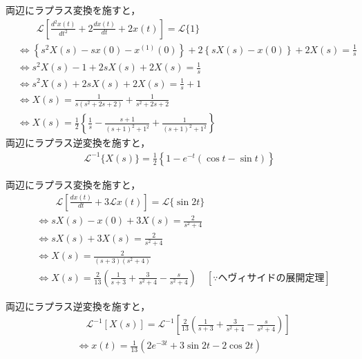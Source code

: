 \documentclass[a4paper,12pt]{article}
\begin{document}
\begin{tcolorbox}[title={3. \( \ddot{x}(t) + 2\dot{x}(t) + 2x(t) = 1\)を解け。ただし、\(x(0)=0,\dot{x}(0)=1\)とする。
    }]
    \quad 両辺にラプラス変換を施すと，
    \begin{align*}
        &\qquad \mathcal{L}\left[ \frac{d^2 x(t)}{dt^2} + 2 \frac{dx(t)}{dt} + 2x(t) \right] = \mathcal{L}\{1\} \\
        &\Leftrightarrow \left\{s^2 X(s) - sx(0) - x^{(1)}(0) \right\} 
        + 2 \left\{ sX(s) - x(0) \right\} + 2X(s) 
        = \frac{1}{s} \\
        &\Leftrightarrow s^2 X(s) - 1 + 2sX(s) + 2X(s) = \frac{1}{s} \\
        &\Leftrightarrow s^2 X(s) + 2sX(s) + 2X(s) = \frac{1}{s} + 1 \\
        &\Leftrightarrow X(s) = \frac{1}{s(s^2 + 2s + 2)} + \frac{1}{s^2 + 2s + 2} \\
        &\Leftrightarrow X(s) = \frac{1}{2} \left\{ \frac{1}{s} - \frac{s+1}{(s+1)^2 + 1^2} + \frac{1}{(s+1)^2 + 1^2} \right\}
    \end{align*}
    \qquad 両辺にラプラス逆変換を施すと，
        \vspace{-3mm}
    \begin{align*}
        \mathcal{L}^{-1}\{X(s)\} = \frac{1}{2} \left\{ 1 - e^{-t}(\cos t - \sin t) \right\}
    \end{align*}
    
    
    
    \vspace{2mm}
\end{tcolorbox}

\begin{tcolorbox}[title={4. \( \dot{x}(t) + 3x(t) = \sin 2t \)を解け。ただし、\( x(0)=0 \)とする。
    }]
    \quad 両辺にラプラス変換を施すと，
    \begin{align*}
        &\qquad \mathcal{L}\left[\frac{dx(t)}{dt} + 3\mathcal{L} x(t)\right] = \mathcal{L}\{\sin 2t\} \\
        &\Leftrightarrow sX(s) - x(0) + 3X(s) = \frac{2}{s^2 + 4} \\
        &\Leftrightarrow sX(s) + 3X(s) = \frac{2}{s^2 + 4} \\
        &\Leftrightarrow X(s) = \frac{2}{(s+3)(s^2 + 4)}  \\
        &\Leftrightarrow X(s)= \frac{2}{13} \left( \frac{1}{s+3} + \frac{3}{s^2 + 4} - \frac{s}{s^2 + 4} \right) 
        \quad \left[ \because ヘヴィサイドの展開定理 \right]
    \end{align*}
        
    \quad 両辺にラプラス逆変換を施すと，
    \vspace{-3mm}
    \begin{align*}
    &\quad \mathcal{L}^{-1} \left[ X(s) \right] 
    = \mathcal{L}^{-1} \left[ \frac{2}{13} \left( \frac{1}{s+3} + \frac{3}{s^2 + 4} - \frac{s}{s^2 + 4} \right) \right] \\
    &\Leftrightarrow x(t) = \frac{1}{13} \left( 2e^{-3t} + 3\sin 2t - 2\cos 2t \right)
    \end{align*}

\vspace{2mm}
\end{tcolorbox}
\end{document}
